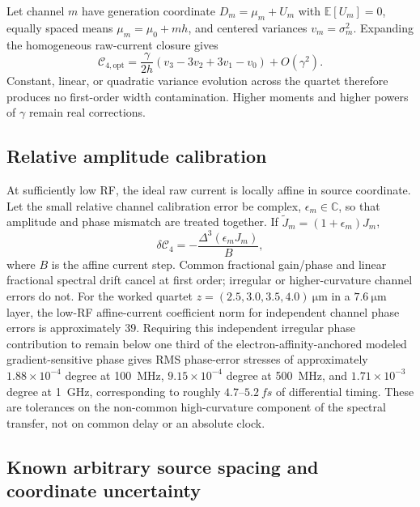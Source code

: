 \documentclass[11pt]{article}
\newcommand{\Cfour}{\mathcal{C}_4}
\newcommand{\E}{\mathbb{E}}
\begin{document}
Let channel $m$ have generation coordinate $D_m=\mu_m+U_m$ with $\E[U_m]=0$, equally spaced means $\mu_m=\mu_0+mh$, and centered variances $v_m=\sigma_m^2$. Expanding the homogeneous raw-current closure gives
\begin{equation}
\boxed{
\mathcal{C}_{4,\mathrm{opt}}
=\frac{\gamma}{2h}(v_3-3v_2+3v_1-v_0)+O(\gamma^2).}
\label{eq:opticalerror}
\end{equation}
Constant, linear, or quadratic variance evolution across the quartet therefore produces no first-order width contamination. Higher moments and higher powers of $\gamma$ remain real corrections.

\subsection{Relative amplitude calibration}

At sufficiently low RF, the ideal raw current is locally affine in source coordinate. Let the small relative channel calibration error be complex, $\epsilon_m\in\mathbb C$, so that amplitude and phase mismatch are treated together. If $\widetilde J_m=(1+\epsilon_m)J_m$,
\begin{equation}
\boxed{
\delta\Cfour=-\frac{\Delta^3(\epsilon_mJ_m)}{B},}
\label{eq:ampcal}
\end{equation}
where $B$ is the affine current step. Common fractional gain/phase and linear fractional spectral drift cancel at first order; irregular or higher-curvature channel errors do not. For the worked quartet $z=(2.5,3.0,3.5,4.0)~\si{\micro\meter}$ in a $7.6~\si{\micro\meter}$ layer, the low-RF affine-current coefficient norm for independent channel phase errors is approximately $39$. Requiring this independent irregular phase contribution to remain below one third of the electron-affinity-anchored modeled gradient-sensitive phase gives RMS phase-error stresses of approximately $1.88\times10^{-4}$ degree at \SI{100}{MHz}, $9.15\times10^{-4}$ degree at \SI{500}{MHz}, and $1.71\times10^{-3}$ degree at \SI{1}{GHz}, corresponding to roughly $4.7$--$5.2~\si{fs}$ of differential timing. These are tolerances on the non-common high-curvature component of the spectral transfer, not on common delay or an absolute clock.

\subsection{Known arbitrary source spacing and coordinate uncertainty}
\end{document}
